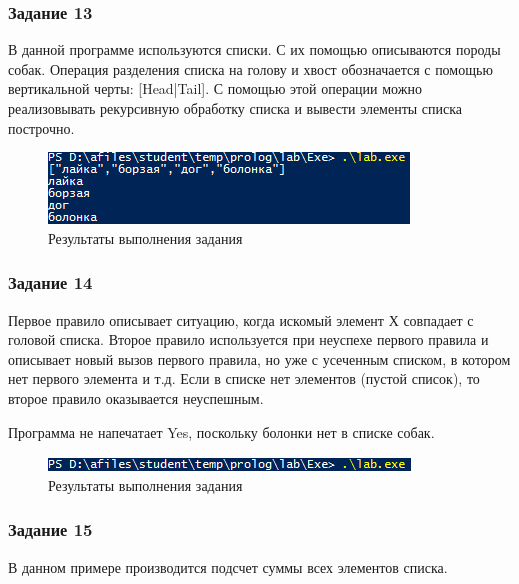 \documentclass[14pt,a4paper,report]{report}
\begin{document}
\subsubsection{Задание 13}

В данной программе используются списки. С их помощью описываются породы собак. Операция разделения списка на голову и хвост обозначается с помощью вертикальной черты: [Head|Tail]. С помощью этой операции можно реализовывать рекурсивную обработку списка и вывести элементы списка построчно.



\begin{figure}[h!]
	\centering
	\includegraphics[scale = 1.0]{images/d13.png}
	\caption{Результаты выполнения задания}
\end{figure}

\subsubsection{Задание 14}

Первое правило описывает ситуацию, когда искомый элемент Х совпадает с головой списка. Второе правило используется при неуспехе первого правила и описывает новый вызов первого правила, но уже с усеченным списком, в котором нет первого элемента и т.д. Если в списке нет элементов (пустой список), то второе правило оказывается неуспешным.

Программа не напечатает Yes, поскольку болонки нет в списке собак.




\begin{figure}[h!]
	\centering
	\includegraphics[scale = 1.0]{images/d14.png}
	\caption{Результаты выполнения задания}
\end{figure}

\subsubsection{Задание 15}

В данном примере производится подсчет суммы всех элементов списка. 
\end{document}
